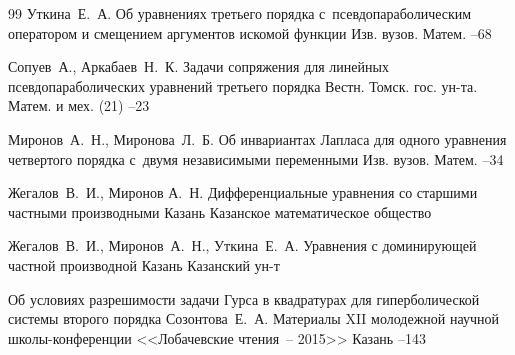 \begin{thebibliography}{99}
\by Уткина~Е.~А.
\paper Об уравнениях третьего порядка с~псевдопараболическим оператором и смещением аргументов искомой функции
\jour Изв. вузов. Матем.
--68
%


\by Сопуев~А., Аркабаев~Н.~К.
\paper Задачи сопряжения для линейных псевдопараболических уравнений третьего порядка
\jour Вестн. Томск. гос. ун-та. Матем. и мех.
(21)
--23



\by Миронов~А.~Н., Миронова~Л.~Б.
\paper Об инвариантах Лапласа для одного уравнения четвертого порядка с~двумя независимыми переменными
\jour Изв. вузов. Матем.
--34

\by Жегалов~В.~И., Миронов А.~Н.
\book Дифференциальные уравнения со старшими частными производными
\publaddr Казань
\publ Казанское математическое общество

\by Жегалов~В.~И., Миронов~А.~Н., Уткина~Е.~А.
\book Уравнения с доминирующей частной производной
\publaddr Казань
\publ Казанский ун-т

\paper Об условиях разрешимости задачи Гурса в квадратурах для гиперболической системы второго порядка
\by  Созонтова~Е.~А.
\inbook Материалы XII молодежной научной школы-конференции <<Лобачевские чтения~-- 2015>>
\publaddr Казань
--143




\end{thebibliography}

\nopagenumber

\newpage

\makeentitle

\vspace{-3mm}






